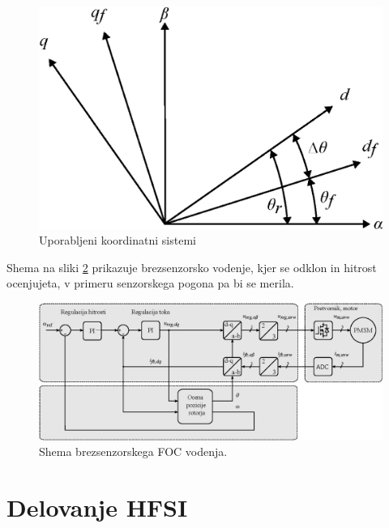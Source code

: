 \documentclass[a4paper,twoside,openright,12pt,slovene]{book}
\begin{document}
\begin{figure}[!htbp]
    \centering
    \includegraphics[width=0.7\columnwidth]{Slike/Inkscape/koordinatniSistemSimple.eps}
    \caption{\label{koordinatniSistemSimple} Uporabljeni koordinatni sistemi}
\end{figure}

Shema na sliki \ref{FOCshema} prikazuje brezsenzorsko vodenje, kjer se odklon in hitrost ocenjujeta, v primeru senzorskega pogona pa bi se merila.

\begin{figure}[!htbp]
    \centering
    \includegraphics[width=1\columnwidth]{Slike/Inkscape/FOCsimple.eps}
    \caption{\label{FOCshema} Shema brezsenzorskega FOC vodenja.}
\end{figure}


\chapter{Delovanje HFSI} \label{teorija}
\end{document}
